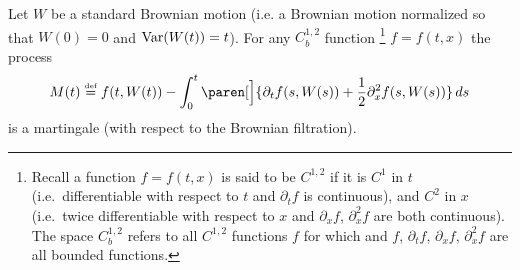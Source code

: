 \begin{theorem}
  Let $W$ be a standard Brownian motion (i.e. a Brownian motion normalized so that $W(0) = 0$ and $\operatorname{Var}(W(t)) = t$).
  For any $C^{1,2}_b$ function%
  \footnote{%
    Recall a function $f = f(t, x)$ is said to be $C^{1,2}$ if it is $C^1$ in $t$ (i.e.\ differentiable with respect to $t$ and $\partial_t f$ is continuous), and $C^2$ in $x$ (i.e.\ twice differentiable with respect to $x$ and $\partial_x f$, $\partial_x^2 f$ are both continuous).
    The space $C^{1,2}_b$ refers to all $C^{1,2}$ functions $f$ for which and $f$, $\partial_t f$, $\partial_x f$, $\partial_x^2 f$ are all bounded functions.%
  }
  $f = f(t, x)$ the process
  \begin{equation*}
    M(t) \defeq f(t, W(t))
      - \int_0^t \paren[\Big]{
	  \partial_t f(s, W(s)) + \frac{1}{2} \partial_x^2 f(s, W(s))
	} \, ds
  \end{equation*}
  is a martingale (with respect to the Brownian filtration).
\end{theorem}
